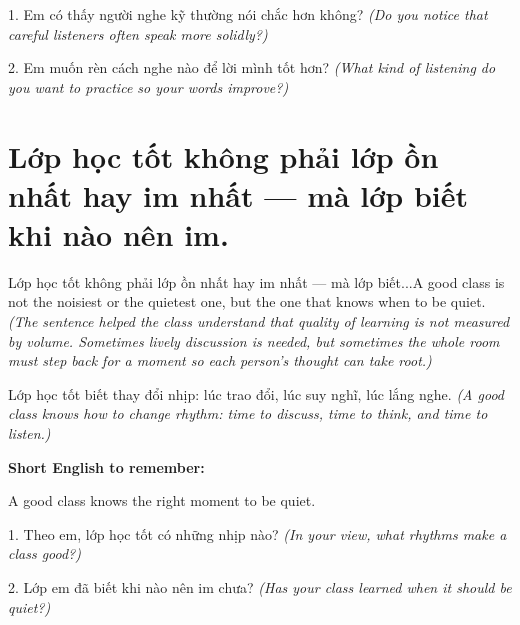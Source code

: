 \begin{tuhocnhanh}
1. Em có thấy người nghe kỹ thường nói chắc hơn không? \textit{(Do you notice that careful listeners often speak more solidly?)}

2. Em muốn rèn cách nghe nào để lời mình tốt hơn? \textit{(What kind of listening do you want to practice so your words improve?)}
\end{tuhocnhanh}
\ngancach


\section{Lớp học tốt không phải lớp ồn nhất hay im nhất — mà lớp biết khi nào nên im.}
\begin{truyen}{Lớp học tốt không phải lớp ồn nhất hay im nhất — mà lớp biết...}{A good class is not the noisiest or the quietest one, but the one that knows when to be quiet.}
\textit{(The sentence helped the class understand that quality of learning is not measured by volume. Sometimes lively discussion is needed, but sometimes the whole room must step back for a moment so each person's thought can take root.)}
\end{truyen}

\begin{baihoc}
Lớp học tốt biết thay đổi nhịp: lúc trao đổi, lúc suy nghĩ, lúc lắng nghe.
\textit{(A good class knows how to change rhythm: time to discuss, time to think, and time to listen.)}
\end{baihoc}

\begin{ghinhoanh}
\textbf{Short English to remember:}

A good class knows the right moment to be quiet.

\end{ghinhoanh}

\begin{tuhocnhanh}
1. Theo em, lớp học tốt có những nhịp nào? \textit{(In your view, what rhythms make a class good?)}

2. Lớp em đã biết khi nào nên im chưa? \textit{(Has your class learned when it should be quiet?)}
\end{tuhocnhanh}
\ngancach


